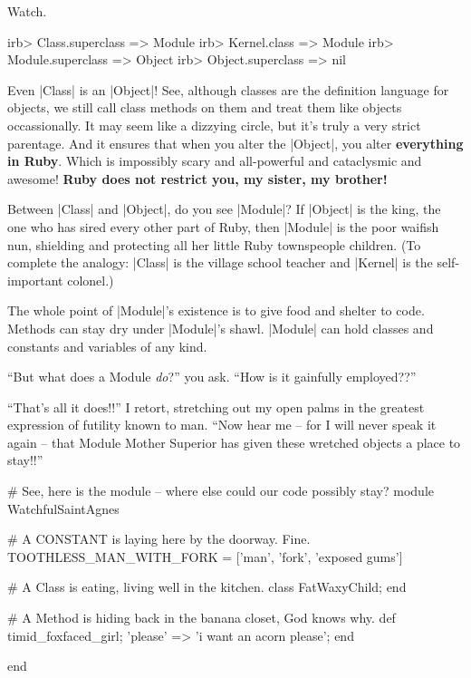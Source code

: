 \documentclass[12pt,twoside]{report}
\begin{document}
Watch.


\begin{consolecode}

 irb> Class.superclass
   => Module
 irb> Kernel.class
   => Module
 irb> Module.superclass
   => Object
 irb> Object.superclass
   => nil

\end{consolecode}


Even \rubyinline|Class| is an
\rubyinline|Object|!  See, although classes are the
definition language for objects, we still call class methods on them
and treat them like objects occassionally.  It may seem like a
dizzying circle, but it's truly a very strict parentage.  And it
ensures that when you alter the \rubyinline|Object|,
you alter {\bf everything in Ruby}.  Which is impossibly scary and
all-powerful and cataclysmic and awesome!  {\bf Ruby does not restrict
  you, my sister, my brother!}

Between \rubyinline|Class| and
\rubyinline|Object|, do you see
\rubyinline|Module|?  If
\rubyinline|Object| is the king, the one who has sired
every other part of Ruby, then \rubyinline|Module| is
the poor waifish nun, shielding and protecting all her little Ruby
townspeople children.  (To complete the analogy:
\rubyinline|Class| is the village school teacher and
\rubyinline|Kernel| is the self-important colonel.)

The whole point of \rubyinline|Module|'s existence is
to give food and shelter to code.  Methods can stay dry under
\rubyinline|Module|'s shawl.
\rubyinline|Module| can hold classes and constants and
variables of any kind.

``But what does a Module {\em do}?'' you ask.  ``How is it gainfully
employed??''

``That's all it does!!'' I retort, stretching out my open palms in the
greatest expression of futility known to man.  ``Now hear me -- for I
will never speak it again -- that Module Mother Superior has given
these wretched objects a place to stay!!''


\begin{rubycode}

 # See, here is the module -- where else could our code possibly stay?
 module WatchfulSaintAgnes

   # A CONSTANT is laying here by the doorway.  Fine.
   TOOTHLESS_MAN_WITH_FORK = ['man', 'fork', 'exposed gums']

   # A Class is eating, living well in the kitchen.
   class FatWaxyChild; end

   # A Method is hiding back in the banana closet, God knows why.
   def timid_foxfaced_girl; {'please' => 'i want an acorn please'}; end

 end

\end{rubycode}
\end{document}

